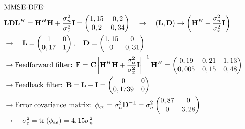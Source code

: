 \begin{align*}
	& \text{MMSE-DFE:} \\
	& \mathbf{LDL}^H=\mathbf{H}^H\mathbf{H}+\frac{\sigma_n^2}{\sigma_x^2}\mathbf{I}=
	\begin{pmatrix}
	1,15 & 0,2 \\
	0,2 & 0,34
	\end{pmatrix}
	\quad\rightarrow\quad\left(\mathbf{L,D}\right)\rightarrow \left(\mathbf{H}^H+\frac{\sigma_n^2}{\sigma_x^2}\mathbf{I}\right) \\
	& \rightarrow\quad\mathbf{L}=
	\begin{pmatrix}
	1 & 0 \\
	0,17 & 1
	\end{pmatrix},\quad\mathbf{D}=
	\begin{pmatrix}
	1,15 & 0 \\
	0 & 0,31
	\end{pmatrix} \\
	& \rightarrow\text{Feedforward filter: }\mathbf{F=C}\left|\mathbf{H}^H\mathbf{H}+\frac{\sigma_n^2}{\sigma_x^2}\mathbf{I}\right|^{-1}\mathbf{H}^H=
	\begin{pmatrix}
	0,19 & 0,21 & 1,13 \\
	0,005 & 0,15 & 0,48
	\end{pmatrix} \\
	& \rightarrow\text{Feedback filter: }\mathbf{B=L-I}=
	\begin{pmatrix}
	0 & 0 \\
	0,1739 & 0
	\end{pmatrix} \\
	& \rightarrow\text{Error covariance matrix: }\phi_{ee}=\sigma_n^2\mathbf{D}^{-1}=\sigma_n^2
	\begin{pmatrix}
	0,87 & 0 \\
	0 & 3,28
	\end{pmatrix} \\
	& \rightarrow\quad\sigma_e^2=\operatorname{tr}\left(\phi_{ee}\right)=4,15\sigma_n^2
\end{align*}